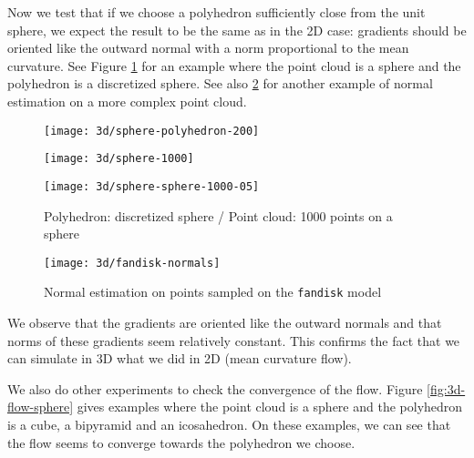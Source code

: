 Now we test that if we choose a polyhedron sufficiently close from the unit
sphere, we expect the result to be the same as in the 2D case: gradients should
be oriented like the outward normal with a norm proportional to the mean
curvature. See Figure \ref{fig:3d-mean-curvature-sphere-sphere} for an example
where the point cloud is a sphere and the polyhedron is a discretized sphere.
See also \ref{fig:3d-mean-curvature-models} for another example of normal
estimation on a more complex point cloud.

\begin{figure}[h]
    \centering
    \begin{minipage}{0.32\linewidth}
        \centering
        \texttt{[image: 3d/sphere-polyhedron-200]}
    \end{minipage}
    \begin{minipage}{0.32\linewidth}
        \centering
        \texttt{[image: 3d/sphere-1000]}
    \end{minipage}
    \begin{minipage}{0.32\linewidth}
        \centering
        \texttt{[image: 3d/sphere-sphere-1000-05]}
    \end{minipage}
    \caption{Polyhedron: discretized sphere / Point cloud: 1000 points on a sphere}
    \label{fig:3d-mean-curvature-sphere-sphere}
\end{figure}

\begin{figure}[h]
    \centering
    \texttt{[image: 3d/fandisk-normals]}
    \caption{Normal estimation on points sampled on the \texttt{fandisk} model}
    \label{fig:3d-mean-curvature-models}
\end{figure}

We observe that the gradients are oriented like the outward normals and that
norms of these gradients seem relatively constant. This confirms the fact that
we can simulate in 3D what we did in 2D (mean curvature flow).

We also do other experiments to check the convergence of the flow. Figure
\ref{fig:3d-flow-sphere} gives examples where the point cloud is a sphere and
the polyhedron is a cube, a bipyramid and an icosahedron. On these examples, we
can see that the flow seems to converge towards the polyhedron we choose.

